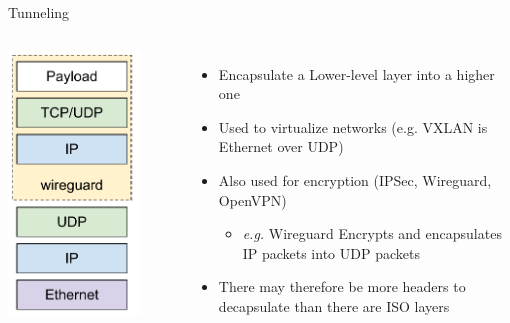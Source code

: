 \begin{frame}{Tunneling}
	\begin{columns}
		\includegraphics[width=0.8\textwidth]{slides/networking-stack-overview/wireguard.pdf}
	\begin{itemize}
		\item Encapsulate a Lower-level layer into a higher one
		\item Used to virtualize networks (e.g. VXLAN is Ethernet over UDP)
		\item Also used for encryption (IPSec, Wireguard, OpenVPN)
			\begin{itemize}
				\item \textit{e.g.} Wireguard Encrypts and encapsulates IP packets into UDP packets
			\end{itemize}
		\item There may therefore be more headers to decapsulate than there are ISO layers
	\end{itemize}
	\end{columns}
\end{frame}

